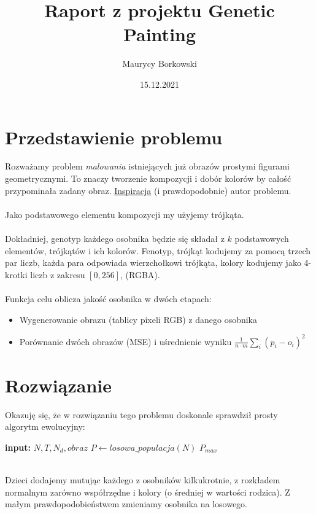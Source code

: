 \documentclass{article}
\title{Raport z projektu \textbf{Genetic Painting}}
\date{15.12.2021}
\author{Maurycy Borkowski}
\begin{document}
\maketitle
\section{Przedstawienie problemu}
Rozważamy problem \textit{malowania} istniejących już obrazów prostymi figurami geometrycznymi. To znaczy tworzenie kompozycji i dobór kolorów by całość przypominała zadany obraz. \href{https://rogerjohansson.blog/2008/12/07/genetic-programming-evolution-of-mona-lisa/}{Inspiracja} (i prawdopodobnie) autor problemu.\\\\
Jako podstawowego elementu kompozycji my użyjemy trójkąta.\\\\
Dokładniej, genotyp każdego osobnika będzie się składał z $k$ podstawowych elementów, trójkątów i ich kolorów. Fenotyp, trójkąt kodujemy za pomocą trzech par liczb, każda para odpowiada wierzchołkowi trójkąta, kolory kodujemy jako 4-krotki liczb z zakresu $[0,256]$, (RGBA).\\\\
Funkcja celu oblicza jakość osobnika w dwóch etapach:
\begin{itemize}
    \item Wygenerowanie obrazu (tablicy pixeli RGB) z danego osobnika
    \item Porównanie dwóch obrazów (MSE) i uśrednienie wyniku $\frac{1}{n \cdot m} \sum_i (p_i - o_i)^2$
\end{itemize}
\section{Rozwiązanie}
Okazuję się, że w rozwiązaniu tego problemu doskonale sprawdził prosty algorytm ewolucyjny:
\begin{algorithm}
\begin{algorithmic}
\STATE \textbf{input:} $N, T, N_d, obraz$
\STATE $P \leftarrow losowa\_populacja(N)$
\ENDWHILE
\RETURN $P_{max}$
\end{algorithmic}
\end{algorithm}
\\Dzieci dodajemy mutując każdego z osobników kilkukrotnie, z rozkładem normalnym zarówno współrzędne i kolory (o średniej w wartości rodzica). Z małym prawdopodobieństwem zmieniamy osobnika na losowego.\\
\end{document}
